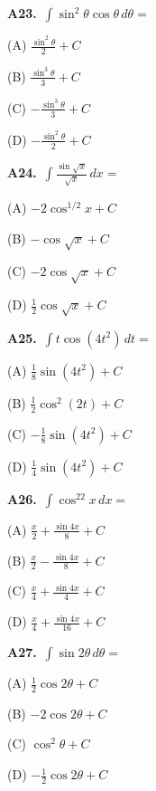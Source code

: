 \documentclass[11pt]{article}
\begin{document}
\bigskip\noindent\textbf{A23.}\ $\displaystyle\int \sin^2\theta\cos\theta\,d\theta=$
\begin{list}{}{\setlength{\leftmargin}{3em}\setlength{\labelwidth}{2.5em}\setlength{\itemsep}{0pt}\setlength{\topsep}{2pt}}
\item[(A)] $\frac{\sin^2\theta}2+C$
\item[(B)] $\frac{\sin^3\theta}3+C$
\item[(C)] $-\frac{\sin^3\theta}3+C$
\item[(D)] $-\frac{\sin^2\theta}2+C$
\end{list}

\bigskip\noindent\textbf{A24.}\ $\displaystyle\int \frac{\sin\sqrt x}{\sqrt x}\,dx=$
\begin{list}{}{\setlength{\leftmargin}{3em}\setlength{\labelwidth}{2.5em}\setlength{\itemsep}{0pt}\setlength{\topsep}{2pt}}
\item[(A)] $-2\cos^{1/2}x+C$
\item[(B)] $-\cos\sqrt x+C$
\item[(C)] $-2\cos\sqrt x+C$
\item[(D)] $\frac12\cos\sqrt x+C$
\end{list}

\bigskip\noindent\textbf{A25.}\ $\displaystyle\int t\cos(4t^2)\,dt=$
\begin{list}{}{\setlength{\leftmargin}{3em}\setlength{\labelwidth}{2.5em}\setlength{\itemsep}{0pt}\setlength{\topsep}{2pt}}
\item[(A)] $\frac18\sin(4t^2)+C$
\item[(B)] $\frac12\cos^2(2t)+C$
\item[(C)] $-\frac18\sin(4t^2)+C$
\item[(D)] $\frac14\sin(4t^2)+C$
\end{list}

\bigskip\noindent\textbf{A26.}\ $\displaystyle\int \cos^22x\,dx=$
\begin{list}{}{\setlength{\leftmargin}{3em}\setlength{\labelwidth}{2.5em}\setlength{\itemsep}{0pt}\setlength{\topsep}{2pt}}
\item[(A)] $\frac x2+\frac{\sin4x}8+C$
\item[(B)] $\frac x2-\frac{\sin4x}8+C$
\item[(C)] $\frac x4+\frac{\sin4x}4+C$
\item[(D)] $\frac x4+\frac{\sin4x}{16}+C$
\end{list}

\bigskip\noindent\textbf{A27.}\ $\displaystyle\int \sin2\theta\,d\theta=$
\begin{list}{}{\setlength{\leftmargin}{3em}\setlength{\labelwidth}{2.5em}\setlength{\itemsep}{0pt}\setlength{\topsep}{2pt}}
\item[(A)] $\frac12\cos2\theta+C$
\item[(B)] $-2\cos2\theta+C$
\item[(C)] $\cos^2\theta+C$
\item[(D)] $-\frac12\cos2\theta+C$
\end{list}
\end{document}
